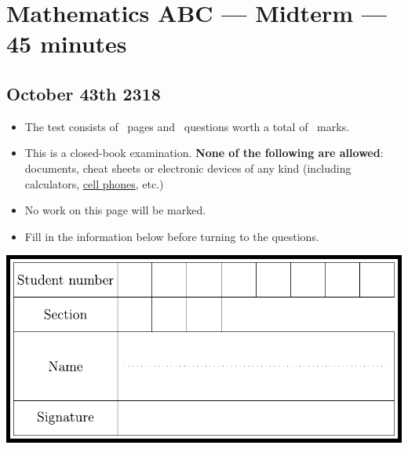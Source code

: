 \documentclass[12pt]{exam}
\begin{document}
\section*{Mathematics ABC --- Midterm --- 45 minutes}
\subsection*{October 43th 2318}
\begin{itemize}
  \item The test consists of \numpages\ pages and \numquestions\ questions worth a total of \numpoints\ marks.
  \item This is a closed-book examination. \textbf{None of the following are allowed}: documents, cheat sheets or electronic devices of any kind (including calculators, \underline{cell phones}, etc.)
  \item No work on this page will be marked.
  \item Fill in the information below before turning to the questions.
\end{itemize}

\begin{center}
  \includegraphics{idBox2}
\end{center}


\vfill
\newpage
\end{document}
